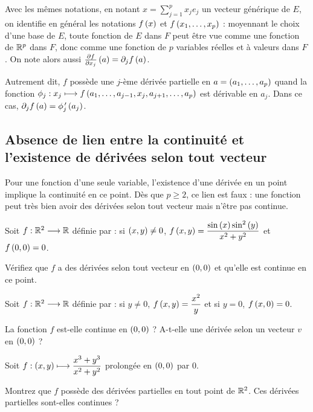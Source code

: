 Avec les mêmes notations, en notant \(x=\sum_{j=1}^px_je_j\) un vecteur générique de \(E\), on identifie en général les notations \(f\left(x\right)\) et \(f\left(x_1,\dots,x_p\right)\) : moyennant le choix d'une base de \(E\), toute fonction de \(E\) dans \(F\) peut être vue comme une fonction de \(\mathbb{R}^p\) dans \(F\), donc comme une fonction de \(p\) variables réelles et à valeurs dans \(F\). On note alors aussi \(\pdv{f}{x_j}\paren{a}=\pdif{j}f\paren{a}\).

Autrement dit, \(f\) possède une \(j\)-ème dérivée partielle en \(a=\left(a_1,\dots,a_p\right)\) quand la fonction \(\phi_j:x_j\longmapsto f\left(a_1,\dots,a_{j-1},x_j,a_{j+1},\dots,a_p\right)\) est dérivable en \(a_j\). Dans ce cas, \(\pdif{j}f\paren{a}=\phi_j\prim\paren{a_j}\).

\subsection{Absence de lien entre la continuité et l'existence de dérivées selon tout vecteur}

Pour une fonction d'une seule variable, l'existence d'une dérivée en un point implique la continuité en ce point. Dès que \(p\geq2\), ce lien est faux : une fonction peut très bien avoir des dérivées selon tout vecteur mais n'être pas continue.

\begin{exo}
Soit \(f:\mathbb{R}^2\longrightarrow\mathbb{R}\) définie par : si \(\left(x,y\right)\not=0\), \(f\left(x,y\right)=\dfrac{\sin\left(x\right)\sin^2\left(y\right)}{x^2+y^2}\) et \(f\left(0,0\right)=0\).

Vérifiez que \(f\) a des dérivées selon tout vecteur en \(\left(0,0\right)\) et qu'elle est continue en ce point.
\end{exo}

\begin{exo}
Soit \(f:\mathbb{R}^2\longrightarrow\mathbb{R}\) définie par : si \(y\not=0\), \(f\left(x,y\right)=\dfrac{x^2}{y}\) et si \(y=0\), \(f\left(x,0\right)=0\).

La fonction \(f\) est-elle continue en \(\left(0,0\right)\) ? A-t-elle une dérivée selon un vecteur \(v\) en \(\left(0,0\right)\) ?
\end{exo}

\begin{exo}
Soit \(f:\left(x,y\right)\longmapsto\dfrac{x^3+y^3}{x^2+y^2}\) prolongée en \(\left(0,0\right)\) par \(0\).

Montrez que \(f\) possède des dérivées partielles en tout point de \(\mathbb{R}^2\). Ces dérivées partielles sont-elles continues ?
\end{exo}

